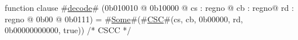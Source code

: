 function clause #\hyperref[zdecode]{decode}# (0b010010 @ 0b10000 @ cs : regno @ cb : regno@ rd : regno @ 0b00 @ 0b0111) = #\hyperref[zSome]{Some}#(#\hyperref[zCSC]{CSC}#(cs, cb, 0b00000, rd, 0b00000000000, true))     /* CSCC */
